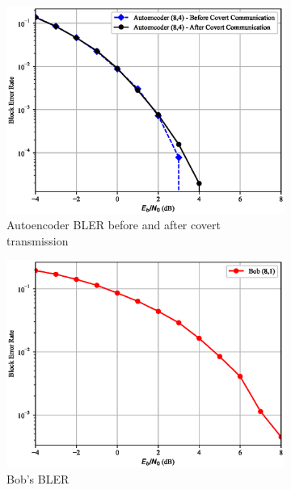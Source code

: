\begin{figure}[th!] \label{fig:awgn_results}
	\begin{subfigure}{0.3\textwidth}
		\includegraphics[width=\linewidth]{figs/covert_autoencoder_bler_awgn}
		\caption{Autoencoder BLER before and after covert transmission}
	\end{subfigure}
	\hspace*{\fill}
	\begin{subfigure}{0.3\textwidth}
		\includegraphics[width=\linewidth]{figs/bob_bler_awgn}
		\caption{Bob's BLER}	
	\end{subfigure}
	\hspace*{\fill}
	\begin{subfigure}{0.3\textwidth}

\end{subfigure}
\end{figure}
